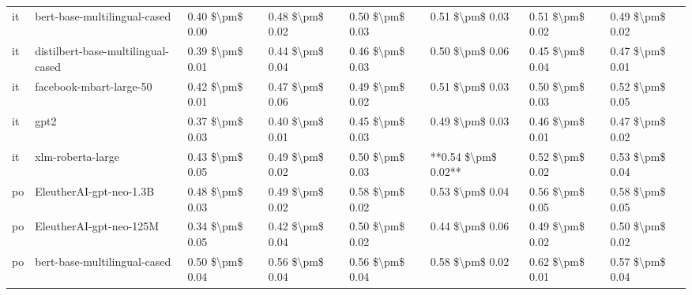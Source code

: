 \begin{tabular}{llllllll}
      it &       bert-base-multilingual-cased & 0.40 \$\textbackslash pm\$ 0.00 &           0.48 \$\textbackslash pm\$ 0.02 &       0.50 \$\textbackslash pm\$ 0.03 &        0.51 \$\textbackslash pm\$ 0.03 &                         0.51 \$\textbackslash pm\$ 0.02 &     0.49 \$\textbackslash pm\$ 0.02 \\
      it & distilbert-base-multilingual-cased & 0.39 \$\textbackslash pm\$ 0.01 &           0.44 \$\textbackslash pm\$ 0.04 &       0.46 \$\textbackslash pm\$ 0.03 &        0.50 \$\textbackslash pm\$ 0.06 &                         0.45 \$\textbackslash pm\$ 0.04 &     0.47 \$\textbackslash pm\$ 0.01 \\
      it &            facebook-mbart-large-50 & 0.42 \$\textbackslash pm\$ 0.01 &           0.47 \$\textbackslash pm\$ 0.06 &       0.49 \$\textbackslash pm\$ 0.02 &        0.51 \$\textbackslash pm\$ 0.03 &                         0.50 \$\textbackslash pm\$ 0.03 &     0.52 \$\textbackslash pm\$ 0.05 \\
      it &                               gpt2 & 0.37 \$\textbackslash pm\$ 0.03 &           0.40 \$\textbackslash pm\$ 0.01 &       0.45 \$\textbackslash pm\$ 0.03 &        0.49 \$\textbackslash pm\$ 0.03 &                         0.46 \$\textbackslash pm\$ 0.01 &     0.47 \$\textbackslash pm\$ 0.02 \\
      it &                  xlm-roberta-large & 0.43 \$\textbackslash pm\$ 0.05 &           0.49 \$\textbackslash pm\$ 0.02 &       0.50 \$\textbackslash pm\$ 0.03 &    **0.54 \$\textbackslash pm\$ 0.02** &                         0.52 \$\textbackslash pm\$ 0.02 &     0.53 \$\textbackslash pm\$ 0.04 \\
      po &            EleutherAI-gpt-neo-1.3B & 0.48 \$\textbackslash pm\$ 0.03 &           0.49 \$\textbackslash pm\$ 0.02 &       0.58 \$\textbackslash pm\$ 0.02 &        0.53 \$\textbackslash pm\$ 0.04 &                         0.56 \$\textbackslash pm\$ 0.05 &     0.58 \$\textbackslash pm\$ 0.05 \\
      po &            EleutherAI-gpt-neo-125M & 0.34 \$\textbackslash pm\$ 0.05 &           0.42 \$\textbackslash pm\$ 0.04 &       0.50 \$\textbackslash pm\$ 0.02 &        0.44 \$\textbackslash pm\$ 0.06 &                         0.49 \$\textbackslash pm\$ 0.02 &     0.50 \$\textbackslash pm\$ 0.02 \\
      po &       bert-base-multilingual-cased & 0.50 \$\textbackslash pm\$ 0.04 &           0.56 \$\textbackslash pm\$ 0.04 &       0.56 \$\textbackslash pm\$ 0.04 &        0.58 \$\textbackslash pm\$ 0.02 &                         0.62 \$\textbackslash pm\$ 0.01 &     0.57 \$\textbackslash pm\$ 0.04 \\

\end{tabular}
